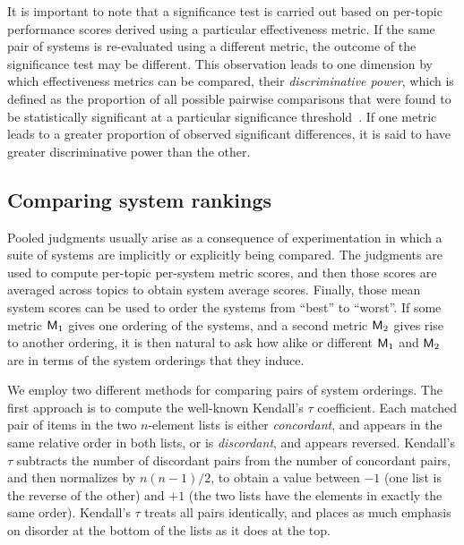 It is important to note that a significance test is carried out based
on per-topic performance scores derived using a particular
effectiveness metric.
If the same pair of systems is re-evaluated using a different metric,
the outcome of the significance test may be different.
This observation leads to one dimension by which effectiveness metrics
can be compared, their {\emph{discriminative power}}, which is defined
as the proportion of all possible pairwise comparisons that were found
to be statistically significant at a particular significance
threshold~\cite{sakai06sigir}.
If one metric leads to a greater proportion of observed significant
differences, it is said to have greater discriminative power than
the other.

\subsection{Comparing system rankings}

Pooled judgments usually arise as a consequence of experimentation in
which a suite of systems are implicitly or explicitly being compared.
The judgments are used to compute per-topic per-system metric scores,
and then those scores are averaged across topics to obtain system
average scores.
Finally, those mean system scores can be used to order the systems
from ``best'' to ``worst''.
If some metric ${\mbox{\sf{M}}}_1$ gives one ordering of the systems, and
a second metric ${\mbox{\sf{M}}}_2$ gives rise to another ordering, it is
then natural to ask how alike or different ${\mbox{\sf{M}}}_1$ and
${\mbox{\sf{M}}}_2$ are in terms of the system orderings that they induce.

We employ two different methods for comparing pairs of system
orderings.
The first approach is to compute the well-known Kendall's $\tau$
coefficient.
Each matched pair of items in the two $n$-element lists is either
{\emph{concordant}}, and appears in the same relative order in both
lists, or is {\emph{discordant}}, and appears reversed.
Kendall's $\tau$ subtracts the number of discordant pairs from the
number of concordant pairs, and then normalizes by $n(n-1)/2$, to
obtain a value between $-1$ (one list is the reverse of the other) and
$+1$ (the two lists have the elements in exactly the same order).
Kendall's $\tau$ treats all pairs identically, and places as much
emphasis on disorder at the bottom of the lists as it does at the top.

